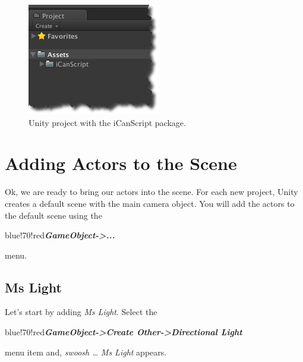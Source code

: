 \begin{figure}[htbp]
\centering
\includegraphics[keepaspectratio,width=\textwidth,height=0.75\textheight]{icanscript-empty-project.png}
\caption{Unity project with the iCanScript package.}
\label{icanscript-empty-project.png}
\end{figure}

\clearpage

\section{Adding Actors to the Scene}
\label{addingactorstothescene}

Ok, we are ready to bring our actors into the scene. For each new project, Unity creates a default scene with the main camera object. You will add the actors to the default scene using the \begin{color}{blue!70!red}\emph{\textbf{GameObject->...}}\end{color} menu.

\subsection{Ms Light}
\label{mslight}

Let's start by adding \emph{Ms Light}. Select the \begin{color}{blue!70!red}\emph{\textbf{GameObject->Create Other->Directional Light}}\end{color} menu item and, \emph{swoosh {\ldots} Ms Light} appears.

